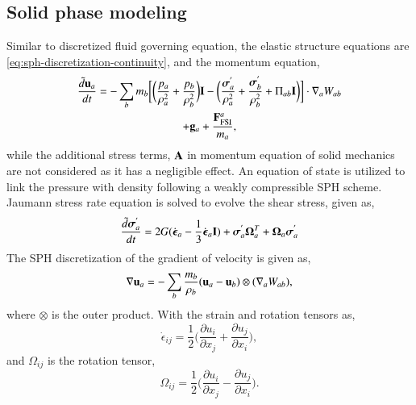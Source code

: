 \subsection{Solid phase modeling}\label{subsec:solid}
Similar to discretized fluid governing equation, the elastic structure equations are
\eqref{eq:sph-discretization-continuity}, and the momentum equation,
\begin{multline}
  \label{eq:sph-momentum-solid}
  \frac{\tilde{d}\mathbf{u}_{a}}{dt} = - \sum_{b} m_b \bigg[
  \bigg(\frac{p_a}{\rho_a^2} + \frac{p_b}{\rho_b^2}\bigg) \mathbf{I} -
  \bigg(\frac{\boldsymbol{\sigma}^{'}_{a}}{\rho_a^2} +
  \frac{\boldsymbol{\sigma}^{'}_{b}}{\rho_b^2} + \Pi_{ab} \mathbf{I} \bigg) \bigg]  \cdot \nabla_{a} W_{ab} \\
  + \mathbf{g}_{a} + \frac{\mathbf{F}^a_{\text{FSI}}}{m_a},
\end{multline}
while the additional stress terms, $\mathbf{A}$ in momentum equation of solid
mechanics are not considered as it has a negligible effect. An equation of state
is utilized to link the pressure with density following a weakly compressible
SPH scheme. Jaumann stress rate equation is solved to evolve the shear stress,
given as,
\begin{multline}
  \label{eq:sph-modified-jaumann-stress}
  \frac{\tilde{d}\boldsymbol{\sigma}^{'}_{a}}{dt} = 2G (\dot{\boldsymbol{\epsilon}}_{a} -
  \frac{1}{3} \dot{\boldsymbol{\epsilon}}_{a} \mathbf{I}) + \boldsymbol{\sigma}^{'}_{a}
  \boldsymbol{\Omega}_{a}^{T} +
  \boldsymbol{\Omega}_{a} \boldsymbol{\sigma}^{'}_{a}
\end{multline}
The SPH discretization of the
gradient of velocity is given as,
\begin{equation}
  \label{eq:sph-vel-grad}
  \nabla \mathbf{u}_a =
  - \sum_{b} \frac{m_b}{\rho_{b}} (\mathbf{u}_{a} - \mathbf{u}_{b}) \otimes (\nabla_{a} W_{ab}),
\end{equation}
where $\otimes$ is the outer product. With the strain and rotation tensors as,
\begin{equation}
  \label{eq:strain-tensor}
  \dot{\epsilon}_{ij} = \frac{1}{2} \bigg(\frac{\partial u_i}{\partial x_j} +
  \frac{\partial u_j}{\partial x_i} \bigg),
\end{equation}
and $\Omega_{ij}$ is the rotation tensor,
\begin{equation}
  \label{eq:rotational-tensor}
  \Omega_{ij} = \frac{1}{2} \bigg(\frac{\partial u_i}{\partial x_j} -
  \frac{\partial u_j}{\partial x_i} \bigg).
\end{equation}


